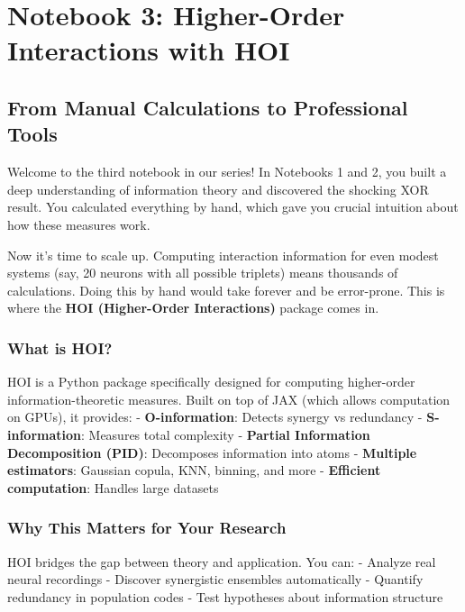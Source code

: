 \documentclass[
  11pt,
  letterpaper,
  oneside,
  openany]{book}
\begin{document}
\chapter{Notebook 3: Higher-Order Interactions with
HOI}\label{notebook-3-higher-order-interactions-with-hoi}

\section{From Manual Calculations to Professional
Tools}\label{from-manual-calculations-to-professional-tools}

Welcome to the third notebook in our series! In Notebooks 1 and 2, you
built a deep understanding of information theory and discovered the
shocking XOR result. You calculated everything by hand, which gave you
crucial intuition about how these measures work.

Now it's time to scale up. Computing interaction information for even
modest systems (say, 20 neurons with all possible triplets) means
thousands of calculations. Doing this by hand would take forever and be
error-prone. This is where the \textbf{HOI (Higher-Order Interactions)}
package comes in.

\subsection{What is HOI?}\label{what-is-hoi}

HOI is a Python package specifically designed for computing higher-order
information-theoretic measures. Built on top of JAX (which allows
computation on GPUs), it provides: - \textbf{O-information}: Detects
synergy vs redundancy - \textbf{S-information}: Measures total
complexity - \textbf{Partial Information Decomposition (PID)}:
Decomposes information into atoms - \textbf{Multiple estimators}:
Gaussian copula, KNN, binning, and more - \textbf{Efficient
computation}: Handles large datasets

\subsection{Why This Matters for Your
Research}\label{why-this-matters-for-your-research}

HOI bridges the gap between theory and application. You can: - Analyze
real neural recordings - Discover synergistic ensembles automatically -
Quantify redundancy in population codes - Test hypotheses about
information structure
\end{document}
